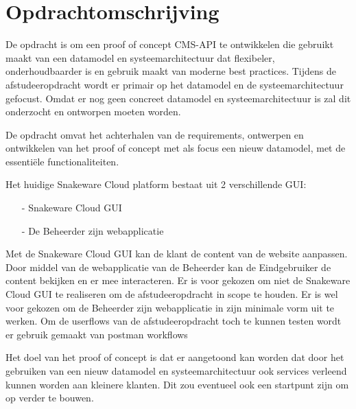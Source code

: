 \section{Opdrachtomschrijving}
\label{sec:Opdrachtomschrijving}
De opdracht is om een proof of concept CMS-API te ontwikkelen die gebruikt maakt van een datamodel en systeemarchitectuur dat flexibeler, onderhoudbaarder is en gebruik maakt van moderne best practices.
Tijdens de afstudeeropdracht wordt er primair op het datamodel en de systeemarchitectuur gefocust.
Omdat er nog geen concreet datamodel en systeemarchitectuur is zal dit onderzocht en ontworpen moeten worden.

\whitespace[2]
De opdracht omvat het achterhalen van de requirements, ontwerpen en ontwikkelen van het proof of concept met als focus een nieuw datamodel, met de essentiële functionaliteiten.

\whitespace[2]
Het huidige Snakeware Cloud platform bestaat uit 2 verschillende \gls{GUI}:
\begin{itemize}
	\item[-] Snakeware Cloud \gls{GUI}
    \item[-] De \gls{Beheerder} zijn webapplicatie
\end{itemize}

\whitespace
Met de Snakeware Cloud \gls{GUI} kan de klant de content van de website aanpassen.
Door middel van de webapplicatie van de \gls{Beheerder} kan de \gls{Eindgebruiker} de content bekijken en er mee interacteren.
Er is voor gekozen om niet de Snakeware Cloud \gls{GUI} te realiseren om de afstudeeropdracht in scope te houden.
Er is wel voor gekozen om de \gls{Beheerder} zijn webapplicatie in zijn minimale vorm uit te werken.
Om de userflows van de afstudeeropdracht toch te kunnen testen wordt er gebruik gemaakt van postman workflows \Parencite{PostmanWorkflows}

\whitespace[2]
Het doel van het proof of concept is dat er aangetoond kan worden dat door het gebruiken van een nieuw datamodel en systeemarchitectuur ook services verleend kunnen worden aan kleinere klanten.
Dit zou eventueel ook een startpunt zijn om op verder te bouwen.
%
